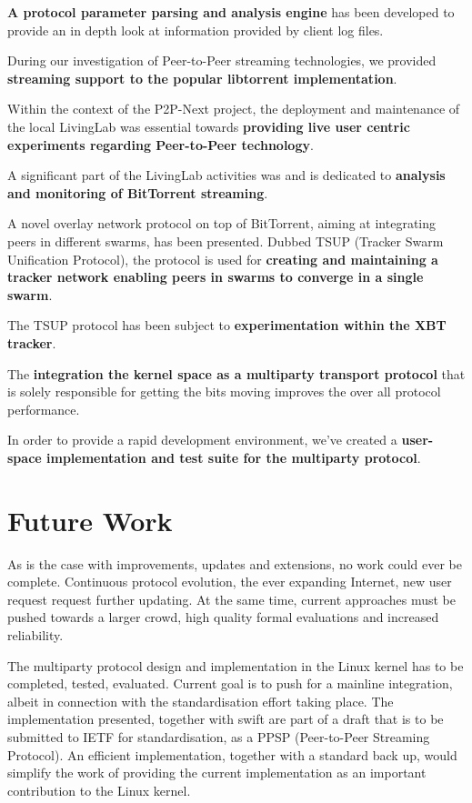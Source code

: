 \textbf{A protocol parameter parsing and analysis engine} has been developed
to provide an in depth look at information provided by client log files.

During our investigation of Peer-to-Peer streaming technologies, we provided
\textbf{streaming support to the popular libtorrent implementation}.

Within the context of the P2P-Next project, the deployment and maintenance of
the local LivingLab was essential towards \textbf{providing live user centric
experiments regarding Peer-to-Peer technology}.

A significant part of the LivingLab activities was and is dedicated to
\textbf{analysis and monitoring of BitTorrent streaming}.

A novel overlay network protocol on top of BitTorrent, aiming at integrating
peers in different swarms, has been presented. Dubbed TSUP (Tracker Swarm
Unification Protocol), the protocol is used for \textbf{creating and
maintaining a tracker network enabling peers in swarms to converge in a single
swarm}.

The TSUP protocol has been subject to \textbf{experimentation within the XBT
tracker}.

The \textbf{integration the kernel space as a multiparty transport
protocol} that is solely responsible for getting the bits moving improves the
over all protocol performance.

In order to provide a rapid development environment, we've created a
\textbf{user-space implementation and test suite for the multiparty protocol}.

\section{Future Work}
\label{sec:conclusion:future}

As is the case with improvements, updates and extensions, no work could ever
be complete. Continuous protocol evolution, the ever expanding Internet, new
user request request further updating. At the same time, current approaches
must be pushed towards a larger crowd, high quality formal evaluations and
increased reliability.

The multiparty protocol design and implementation in the Linux kernel has to
be completed, tested, evaluated. Current goal is to push for a mainline
integration, albeit in connection with the standardisation effort taking
place. The implementation presented, together with swift are part of a draft
that is to be submitted to IETF for standardisation, as a PPSP (Peer-to-Peer
Streaming Protocol). An efficient implementation, together with a standard
back up, would simplify the work of providing the current implementation as an
important contribution to the Linux kernel.

